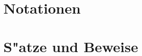 \documentclass[11pt, twoside]{report} %
\begin{document}
%

\appendix
\chapter{Notationen}\label{appNotation}


\chapter{S"atze und Beweise}





\nocite{*}
\printbibliography
\end{document}
